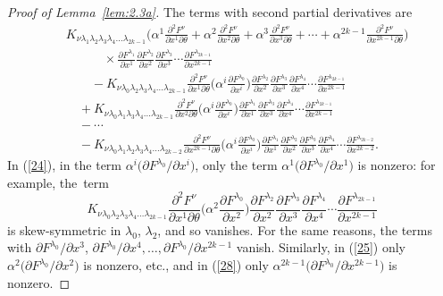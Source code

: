 \documentclass[10pt,a4paper]{amsart}
\numberwithin{equation}{section}
\theoremstyle{definition}
\begin{document}
\begin{proof}[Proof of Lemma~\ref{lem:2.3a}]
The terms with second partial derivatives are
\begin{align}
&K_{\nu\lambda_1\lambda_2\lambda_3\lambda_4\dots\lambda_{2k-1}}\biggl(\alpha^1 \frac{\partial^2F^\nu}{\partial x^1\partial\theta}+ \alpha^2 \frac{\partial^2F^\nu}{\partial x^2\partial\theta}
+\alpha^3 \frac{\partial^2F^\nu}{\partial x^3\partial\theta} +\cdots
+\alpha^{2k-1} \frac{\partial^2F^\nu}{\partial x^{2k-1}\partial\theta}
\biggr)\nonumber\\
&\qquad \quad{} \times \frac{\partial F^{\lambda_1}}{\partial x^1}\frac{\partial F^{\lambda_2}}{\partial x^2}
\frac{\partial F^{\lambda_3}}{\partial x^3}
\cdots\frac{\partial F^{\lambda_{2k-1}}}{\partial x^{2k-1}}\label{23}\\
&\qquad{} -K_{\nu\lambda_0\lambda_2\lambda_3\lambda_4\dots \lambda_{2k-1}}\frac{\partial^2F^\nu}{\partial x^1\partial\theta}
\biggl( \alpha^i\frac{\partial F^{\lambda_0}}{\partial x^i}\biggr)
\frac{\partial F^{\lambda_2}}{\partial x^2}
\frac{\partial F^{\lambda_3}}{\partial x^3}\frac{\partial F^{\lambda_4}}{\partial x^4}\cdots
\frac{\partial F^{\lambda_{2k-1}}}{\partial x^{2k-1}}
\label{24}\\
&\quad + K_{\nu\lambda_0\lambda_1\lambda_3\lambda_4\dots\lambda_{2k-1}}\frac{\partial^2F^\nu}{\partial x^2\partial\theta}
\biggl( \alpha^i\frac{\partial F^{\lambda_0}}{\partial x^i}\biggr)
\frac{\partial F^{\lambda_1}}{\partial x^1}\frac{\partial F^{\lambda_3}}{\partial x^3}
\frac{\partial F^{\lambda_4}}{\partial x^4}\cdots \frac{\partial F^{\lambda_{2k-1}}}{\partial x^{2k-1}}\label{25}\\
&\quad -\cdots\nonumber\\
&\quad - K_{\nu\lambda_0\lambda_1\lambda_2\lambda_3\lambda_4\dots\lambda_{2k-2}}\frac{\partial^2F^\nu}{\partial x^{2k-1}\partial\theta}
\biggl( \alpha^i\frac{\partial F^{\lambda_0}}{\partial x^i}\biggr)
\frac{\partial F^{\lambda_1}}{\partial x^1}\frac{\partial F^{\lambda_2}}{\partial x^2}
\frac{\partial F^{\lambda_3}}{\partial x^3}\frac{\partial F^{\lambda_4}}{\partial x^4}\cdots
\frac{\partial F^{\lambda_{2k-2}}}{\partial x^{2k-2}}.
\label{28}
\end{align}
In (\ref{24}), in the term $\alpha^i \bigl(\partial F^{\lambda_0}/\partial x^i\bigr)$, only the term $\alpha^1 \bigl(\partial F^{\lambda_0}/\partial x^1\bigr)$ is nonzero: for example, the~term
\[K_{\nu\lambda_0\lambda_2\lambda_3\lambda_4\dots \lambda_{2k-1}}\frac{\partial^2F^\nu}{\partial x^1\partial\theta}
\biggl( \alpha^2\frac{\partial F^{\lambda_0}}{\partial x^2}\biggr) \frac{\partial F^{\lambda_2}}{\partial x^2}
\frac{\partial F^{\lambda_3}}{\partial x^3}\frac{\partial F^{\lambda_4}}{\partial x^4}\cdots
\frac{\partial F^{\lambda_{2k-1}}}{\partial x^{2k-1}}\]
is skew-symmetric in $\lambda_0$, $\lambda_2$, and so vanishes. For the same reasons, the terms with
$\partial F^{\lambda_0}/\partial x^3$, $ \partial F^{\lambda_0}/\partial x^4, \dots, \partial F^{\lambda_0}/\partial x^{2k-1}$ vanish.
 Similarly, in (\ref{25}) only $\alpha^2 \bigl(\partial F^{\lambda_0}/\partial x^2\bigr)$ is nonzero, etc.,
and in (\ref{28}) only $\alpha^{2k-1} \bigl(\partial F^{\lambda_0}/\partial x^{2k-1}\bigr)$ is nonzero.


\end{proof}
\end{document}
